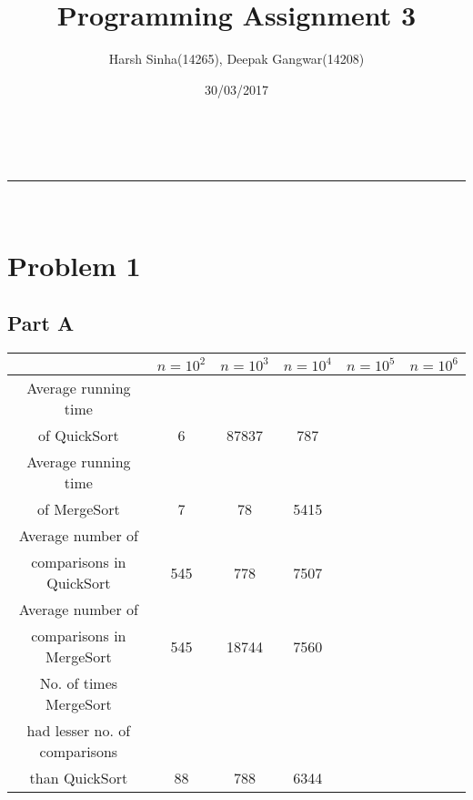 \documentclass[a4paper,11pt]{article}
\makeatletter
\newcommand{\linia}{\rule{\linewidth}{0.5pt}}
\theoremstyle{mytheor}
\renewcommand{\maketitle}{
\begin{center}
\vspace{2ex}
{\huge \textsc{\@title}}
\vspace{1ex}
\\
\linia\\
\@author \hfill \@date
\vspace{4ex}
\end{center}
}
\makeatother
\begin{document}
\title{Programming Assignment \textnumero{} 3}

\author{Harsh Sinha(14265), Deepak Gangwar(14208)}

\date{30/03/2017}

\maketitle

\section*{Problem 1}
\subsection*{Part A}
\begin{center}
 \begin{tabular}{||c c c c c c||} 
 \hline
  & $n = 10^2$ & $n = 10^3$ & $n = 10^4$ & $n = 10^5$ & $n = 10^6$\\ [0.5ex] 
 \hline\hline
 Average running time \\of QuickSort & 6 & 87837 & 787 & &\\ 
 \hline
 Average running time \\of MergeSort & 7 & 78 & 5415 & &\\
 \hline
 Average number of \\comparisons in
QuickSort & 545 & 778 & 7507 & &\\
 \hline
 Average number of \\comparisons in
MergeSort & 545 & 18744 & 7560 & &\\
 \hline
 No. of times MergeSort \\had lesser no.
of comparisons \\than QuickSort & 88 & 788 & 6344 & &\\ [1ex] 
 \hline
\end{tabular}
\end{center}
\end{document}
